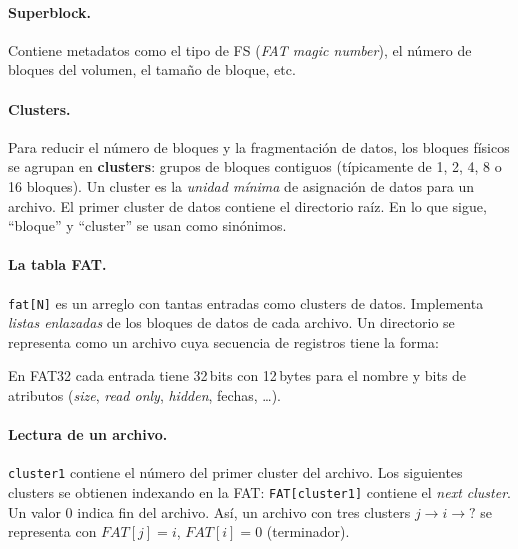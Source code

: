 \documentclass[11pt,a4paper]{article}
\begin{document}
\paragraph{Superblock.}
Contiene metadatos como el tipo de FS (\emph{FAT magic number}), el
número de bloques del volumen, el tamaño de bloque, etc.

\paragraph{Clusters.}
Para reducir el número de bloques y la fragmentación de datos, los
bloques físicos se agrupan en \textbf{clusters}: grupos de bloques
contiguos (típicamente de 1, 2, 4, 8 o 16 bloques). Un cluster es la
\emph{unidad mínima} de asignación de datos para un archivo. El primer
cluster de datos contiene el directorio raíz. En lo que sigue, ``bloque''
y ``cluster'' se usan como sinónimos.

\paragraph{La tabla FAT.}
\texttt{fat[N]} es un arreglo con tantas entradas como clusters de
datos. Implementa \emph{listas enlazadas} de los bloques de datos de
cada archivo. Un directorio se representa como un archivo cuya
secuencia de registros tiene la forma:

\begin{center}
\end{center}

En FAT32 cada entrada tiene 32\,bits con 12\,bytes para el nombre y
bits de atributos (\emph{size}, \emph{read only}, \emph{hidden},
fechas, \ldots).

\paragraph{Lectura de un archivo.}
\texttt{cluster1} contiene el número del primer cluster del archivo.
Los siguientes clusters se obtienen indexando en la FAT:
\verb|FAT[cluster1]| contiene el \emph{next cluster}. Un valor 0
indica fin del archivo. Así, un archivo con tres clusters
$j \to i \to ?$ se representa con
$\textit{FAT}[j] = i$, $\textit{FAT}[i] = 0$ (terminador).
\end{document}
